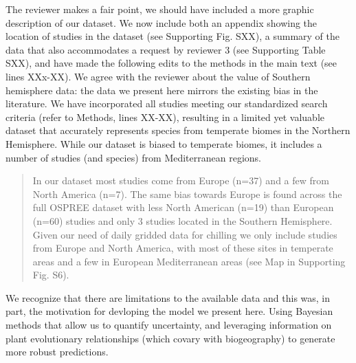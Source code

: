 \documentclass[11pt]{article}
\begin{document}

The reviewer makes a fair point, we should have included a more graphic description of our dataset. We now include both an appendix showing the location of studies in the dataset (see Supporting Fig. SXX), a summary of the data that also accommodates a request by reviewer 3 (see Supporting Table SXX), and have made the following edits to the methods in the main text (see lines XXx-XX). We agree with the reviewer about the value of Southern hemisphere data: the data we present here mirrors the existing bias in the literature. We have incorporated all studies meeting our standardized search criteria (refer to Methods, lines XX-XX), resulting in a limited yet valuable dataset that accurately represents species from temperate biomes in the Northern Hemisphere. While our dataset is biased to temperate biomes, it includes a number of studies (and species) from Mediterranean regions.\\

\begin{quote} %
In our dataset most studies come from Europe (n=37) and a few from North America (n=7). The same bias towards Europe is found across the full OSPREE dataset with less North American (n=19) than European (n=60) studies and only 3 studies located in the Southern Hemisphere. Given our need of daily gridded data for chilling we only include studies from Europe and North America, with most of these sites in temperate areas and a few in European Mediterranean areas (see Map in Supporting Fig. S6).
\end{quote}

We recognize that there are limitations to the available data and this was, in part, the motivation for devloping the model we present here. Using Bayesian methods that allow us to quantify uncertainty, and leveraging information on plant evolutionary relationships (which covary with biogeography) to generate more robust predictions.\\ 
\end{document}
